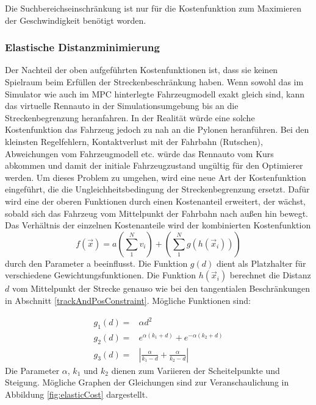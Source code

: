 \documentclass{like}
\begin{document}
Die Suchbereichseinschränkung ist nur für die Kostenfunktion zum Maximieren der Geschwindigkeit benötigt worden.

\subsubsection*{Elastische Distanzminimierung}
Der Nachteil der oben aufgeführten Kostenfunktionen ist, dass sie keinen Spielraum beim Erfüllen der Streckenbeschränkung haben. 
Wenn sowohl das im Simulator wie auch im  \ac{MPC} hinterlegte Fahrzeugmodell exakt gleich sind, kann das virtuelle Rennauto in der Simulationsumgebung bis an die Streckenbegrenzung heranfahren. In der Realität würde eine solche Kostenfunktion das Fahrzeug jedoch zu nah an die Pylonen heranführen. Bei den kleinsten Regelfehlern, Kontaktverlust mit der Fahrbahn (Rutschen), Abweichungen vom Fahrzeugmodell etc. würde das Rennauto vom Kurs abkommen und damit der initiale Fahrzeugzustand ungültig für den Optimierer werden. Um dieses Problem zu umgehen, wird eine neue Art der Kostenfunktion eingeführt, die die Ungleichheitsbedingung der Streckenbegrenzung ersetzt. Dafür wird eine der oberen Funktionen durch einen Kostenanteil erweitert, der wächst, sobald sich das Fahrzeug vom Mittelpunkt der Fahrbahn nach außen hin bewegt. Das Verhältnis der einzelnen Kostenanteile wird der kombinierten Kostenfunktion  
\begin{equation}
	f(\vec{x}) = a \left(\sum_{1}^{N} v_i \right) + \left(\sum_{1}^{N} g \left(h \left(\vec{x}_i \right) \right) \right)
\end{equation}
durch den Parameter a beeinflusst. 
Die Funktion $g(d)$ dient als Platzhalter für verschiedene Gewichtungsfunktionen. Die Funktion $h(\vec{x}_i)$ berechnet die Distanz \(d\) vom Mittelpunkt der Strecke genauso wie bei den tangentialen Beschränkungen in Abschnitt \ref{trackAndPosConstraint}. Mögliche Funktionen sind:

\begin{eqnarray}
	g_1(d) = &\alpha d^2 \\
	g_2(d) = &e^{\alpha (k_1 + d)} + e^{-\alpha(k_2 + d)} \label{eq:distMeasure1}\\
	g_3(d) = &|\frac{\alpha}{k_1-d} + \frac{\alpha}{k_2 - d}| \label{eq:distMeasure2}
\end{eqnarray}
Die Parameter $\alpha$, $k_1$ und $k_2$ dienen zum Variieren der Scheitelpunkte und Steigung.
Mögliche Graphen der Gleichungen sind zur Veranschaulichung in Abbildung \ref{fig:elasticCost} dargestellt.
\end{document}
